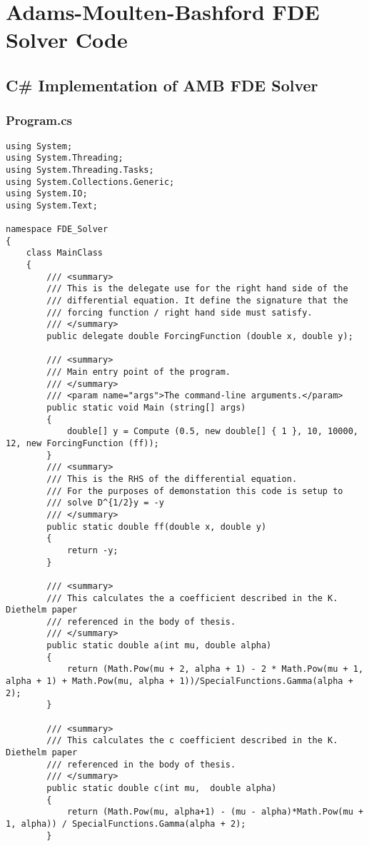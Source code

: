 
\section{Adams-Moulten-Bashford FDE Solver Code}

\subsection{C\# Implementation of AMB FDE Solver}

\subsubsection{Program.cs}
\lstset{language=Java}
\begin{lstlisting}
using System;
using System.Threading;
using System.Threading.Tasks;
using System.Collections.Generic;
using System.IO;
using System.Text;

namespace FDE_Solver
{
	class MainClass
	{
		/// <summary>
		/// This is the delegate use for the right hand side of the
		/// differential equation. It define the signature that the 
		/// forcing function / right hand side must satisfy.
		/// </summary>
		public delegate double ForcingFunction (double x, double y);

		/// <summary>
		/// Main entry point of the program.
		/// </summary>
		/// <param name="args">The command-line arguments.</param>
		public static void Main (string[] args)
		{
		    double[] y = Compute (0.5, new double[] { 1 }, 10, 10000, 12, new ForcingFunction (ff));
		}
		/// <summary>
		/// This is the RHS of the differential equation.
		/// For the purposes of demonstation this code is setup to
		/// solve D^{1/2}y = -y
		/// </summary>
		public static double ff(double x, double y)
		{
			return -y;
		}

		/// <summary>
		/// This calculates the a coefficient described in the K. Diethelm paper
		/// referenced in the body of thesis.
		/// </summary>
		public static double a(int mu, double alpha)
		{
			return (Math.Pow(mu + 2, alpha + 1) - 2 * Math.Pow(mu + 1, alpha + 1) + Math.Pow(mu, alpha + 1))/SpecialFunctions.Gamma(alpha + 2);
		}

		/// <summary>
		/// This calculates the c coefficient described in the K. Diethelm paper
		/// referenced in the body of thesis.
		/// </summary>
		public static double c(int mu,  double alpha)
		{
			return (Math.Pow(mu, alpha+1) - (mu - alpha)*Math.Pow(mu + 1, alpha)) / SpecialFunctions.Gamma(alpha + 2);
		}


\end{lstlisting}

